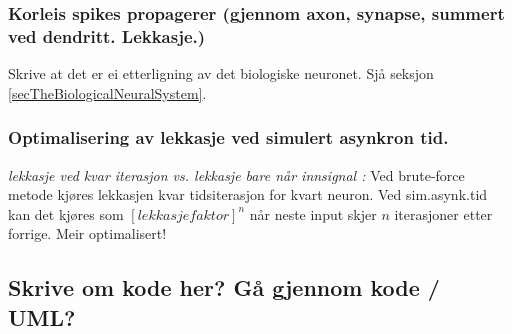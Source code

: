 		\subsubsection{Korleis spikes propagerer (gjennom axon, synapse, summert ved dendritt. Lekkasje.)}
		Skrive at det er ei etterligning av det biologiske neuronet. Sjå seksjon \ref{secTheBiologicalNeuralSystem}.

	\subsubsection{Optimalisering av lekkasje ved simulert asynkron tid.}
		\emph{lekkasje ved kvar iterasjon vs. lekkasje bare når innsignal :}
			Ved brute-force metode kjøres lekkasjen kvar tidsiterasjon for kvart neuron. Ved sim.asynk.tid kan det kjøres som $[lekkasjefaktor]^n$ når neste input skjer $n$ iterasjoner etter forrige. Meir optimalisert!

	\subsection{Skrive om kode her? Gå gjennom kode / UML?}



